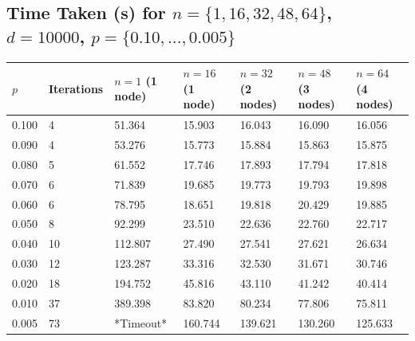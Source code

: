 \documentclass[11pt]{article}
\begin{document}
\begin{appendices}
{\subsection{Time Taken (s) for $n=\{1,16,32,48,64\}$, $d=10000$, $p=\{0.10,...,0.005\}$}
\footnotesize{\label{apdx:prectests}}
\color{black}
\begin{center}
\begin{tabular}{|l|l|l|l|l|l|l|}
\hline
$p$ & Iterations & $n=1$ (1 node) & $n=16$ (1 node) & $n=32$ (2 nodes) & $n=48$ (3 nodes) & $n=64$ (4 nodes)\\
\hline
0.100 & 4 & 51.364 & 15.903 & 16.043 & 16.090 & 16.056\\ 
0.090 & 4 & 53.276 & 15.773 & 15.884 & 15.863 & 15.875\\ 
0.080 & 5 & 61.552 & 17.746 & 17.893 & 17.794 & 17.818\\ 
0.070 & 6 & 71.839 & 19.685 & 19.773 & 19.793 & 19.898\\ 
0.060 & 6 & 78.795 & 18.651 & 19.818 & 20.429 & 19.885\\ 
0.050 & 8 & 92.299 & 23.510 & 22.636 & 22.760 & 22.717\\ 
0.040 & 10 & 112.807 & 27.490 & 27.541 & 27.621 & 26.634\\ 
0.030 & 12 & 123.287 & 33.316 & 32.530 & 31.671 & 30.746\\ 
0.020 & 18 & 194.752 & 45.816 & 43.110 & 41.242 & 40.414\\ 
0.010 & 37 & 389.398 & 83.820 & 80.234 & 77.806 & 75.811\\ 
0.005 & 73 & *Timeout* & 160.744 & 139.621 & 130.260 & 125.633\\ 
\hline
\end{tabular}
\end{center}}


\end{appendices}
\end{document}
